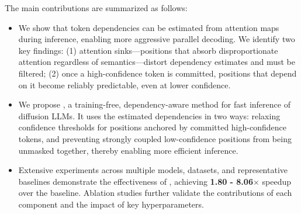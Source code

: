 The main contributions are summarized as follows:
\begin{itemize}[leftmargin=*, itemsep=2pt, parsep=2pt, topsep=0pt, partopsep=0pt]



    \item We show that token dependencies can be estimated from attention maps during inference, enabling more aggressive parallel decoding. We identify two key findings: (1) attention sinks—positions that absorb disproportionate attention regardless of semantics—distort dependency estimates and must be filtered; (2) once a high-confidence token is committed, positions that depend on it become reliably predictable, even at lower confidence.
    

    \item We propose \textbf{\dawn{}}, a training-free, dependency-aware method for fast inference of diffusion LLMs. It 
    uses the estimated dependencies in two ways: relaxing confidence thresholds for positions anchored by committed high-confidence tokens, and preventing strongly coupled low-confidence positions from being unmasked together, thereby enabling more efficient inference.
    
    \item Extensive experiments across multiple models, datasets, and representative baselines demonstrate the effectiveness of \dawn{}, achieving \textbf{1.80 - 8.06$\times$} speedup over the baseline. Ablation studies further validate the contributions of each component and the impact of key hyperparameters. 
\end{itemize}
